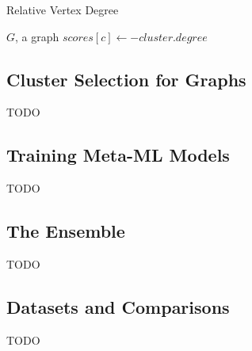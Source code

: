 \begin{algorithm}[h]
    \caption{Relative Vertex Degree}
    \label{alg:relative-vertex-degree}
\begin{algorithmic}[1]
    \REQUIRE $G$, a graph
    \STATE $scores[c] \gets -cluster.degree$
    \ENDFOR
\end{algorithmic}
\end{algorithm}


\subsection{Cluster Selection for Graphs}
\label{subsec:methods:cluster-selection-for-graphs}
TODO

\subsection{Training Meta-ML Models}
\label{subsec:methods:training-meta-ml-models}
TODO


\subsection{The Ensemble}
\label{subsec:methods:the-ensemble}
TODO


\subsection{Datasets and Comparisons}
\label{subsec:methods:datasets-and-comparisons}
TODO




